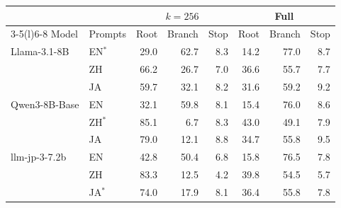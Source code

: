 \begin{tabular}{@{}llrrrrrr@{}}
\toprule
 & & \multicolumn{3}{c}{$k=256$} & \multicolumn{3}{c}{Full} \\
\cmidrule(lr){3-5}\cmidrule(l){6-8}
Model & Prompts & Root & Branch & Stop & Root & Branch & Stop \\
\midrule
Llama-3.1-8B & EN$^\ast$ & 29.0 & 62.7 & 8.3 & 14.2 & 77.0 & 8.7 \\
 & ZH & 66.2 & 26.7 & 7.0 & 36.6 & 55.7 & 7.7 \\
 & JA & 59.7 & 32.1 & 8.2 & 31.6 & 59.2 & 9.2 \\
\addlinespace
Qwen3-8B-Base & EN & 32.1 & 59.8 & 8.1 & 15.4 & 76.0 & 8.6 \\
 & ZH$^\ast$ & 85.1 & 6.7 & 8.3 & 43.0 & 49.1 & 7.9 \\
 & JA & 79.0 & 12.1 & 8.8 & 34.7 & 55.8 & 9.5 \\
\addlinespace
llm-jp-3-7.2b & EN & 42.8 & 50.4 & 6.8 & 15.8 & 76.5 & 7.8 \\
 & ZH & 83.3 & 12.5 & 4.2 & 39.8 & 54.5 & 5.7 \\
 & JA$^\ast$ & 74.0 & 17.9 & 8.1 & 36.4 & 55.8 & 7.8 \\
\bottomrule
\end{tabular}
